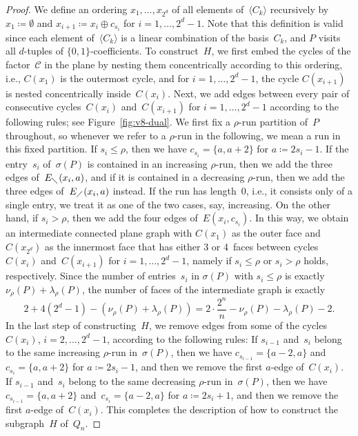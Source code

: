 \documentclass[11pt]{article}
\newcommand{\ass}{\coloneqq}
\newcommand{\cC}{{\mathcal C}}
\begin{document}
\begin{proof}
We define an ordering $x_1,\ldots,x_{2^d}$ of all elements of~$\langle C_k\rangle$ recursively by $x_1\ass \emptyset$ and $x_{i+1}\ass x_i\oplus c_{s_i}$ for $i=1,\ldots,2^d-1$.
Note that this definition is valid since each element of~$\langle C_k\rangle$ is a linear combination of the basis~$C_k$, and $P$ visits all $d$-tuples of $\{0,1\}$-coefficients.
%
To construct~$H$, we first embed the cycles of the factor~$\cC$ in the plane by nesting them concentrically according to this ordering, i.e., $C(x_1)$ is the outermost cycle, and for $i=1,\ldots,2^d-1$, the cycle $C(x_{i+1})$ is nested concentrically inside~$C(x_i)$.
%
Next, we add edges between every pair of consecutive cycles~$C(x_i)$ and~$C(x_{i+1})$ for $i=1,\ldots,2^d-1$ according to the following rules; see Figure~\ref{fig:v8-dual}.
We first fix a $\rho$-run partition of~$P$ throughout, so whenever we refer to a $\rho$-run in the following, we mean a run in this fixed partition.
If $s_i\leq \rho$, then we have $c_{s_i}=\{a,a+2\}$ for $a\ass 2s_i-1$.
If the entry~$s_i$ of~$\sigma(P)$ is contained in an increasing $\rho$-run, then we add the three edges of~$E_{\diagdown}(x_i,a)$, and if it is contained in a decreasing $\rho$-run, then we add the three edges of~$E_{\diagup}(x_i,a)$ instead.
If the run has length~0, i.e., it consists only of a single entry, we treat it as one of the two cases, say, increasing.
On the other hand, if $s_i>\rho$, then we add the four edges of~$E(x_i,c_{s_i})$.
%
In this way, we obtain an intermediate connected plane graph with $C(x_1)$ as the outer face and $C(x_{2^d})$ as the innermost face that has either 3 or 4~faces between cycles~$C(x_i)$ and~$C(x_{i+1})$ for $i=1,\dots,2^d-1$, namely if $s_i \leq \rho$ or $s_i>\rho$ holds, respectively.
Since the number of entries~$s_i$ in $\sigma(P)$ with $s_i\leq \rho$ is exactly $\nu_\rho(P)+\lambda_\rho(P)$, the number of faces of the intermediate graph is exactly
\[ 2+4(2^d-1)-(\nu_\rho(P)+\lambda_\rho(P))=2\cdot \frac{2^n}{n}-\nu_\rho(P)-\lambda_\rho(P)-2. \]
%
In the last step of constructing~$H$, we remove edges from some of the cycles~$C(x_i)$, $i=2,\ldots,2^d-1$, according to the following rules:
If $s_{i-1}$ and~$s_i$ belong to the same increasing $\rho$-run in~$\sigma(P)$, then we have $c_{s_{i-1}}=\{a-2,a\}$ and~$c_{s_i}=\{a,a+2\}$ for $a\ass 2s_i-1$, and then we remove the first $a$-edge of~$C(x_i)$.
If $s_{i-1}$ and~$s_i$ belong to the same decreasing $\rho$-run in~$\sigma(P)$, then we have $c_{s_{i-1}}=\{a,a+2\}$ and~$c_{s_i}=\{a-2,a\}$ for $a\ass 2s_i+1$, and then we remove the first $a$-edge of~$C(x_i)$.
This completes the description of how to construct the subgraph~$H$ of~$Q_n$.

\end{proof}
\end{document}
